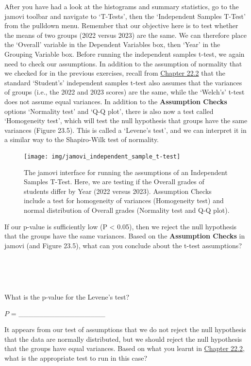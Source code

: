 \documentclass[
]{scrbook}
\begin{document}
After you have had a look at the histograms and summary statistics, go to the jamovi toolbar and navigate to `T-Tests', then the `Independent Samples T-Test' from the pulldown menu.
Remember that our objective here is to test whether the means of two groups (2022 versus 2023) are the same.
We can therefore place the `Overall' variable in the Dependent Variables box, then `Year' in the Grouping Variable box.
Before running the independent samples t-test, we again need to check our assumptions.
In addition to the assumption of normality that we checked for in the previous exercises, recall from \protect\hyperlink{independent-samples-t-test}{Chapter 22.2} that the standard `Student's' independent samples t-test also assumes that the variances of groups (i.e., the 2022 and 2023 scores) are the same, while the `Welch's' t-test does not assume equal variances.
In addition to the \textbf{Assumption Checks} options `Normality test' and `Q-Q plot', there is also now a test called `Homogeneity test', which will test the null hypothesis that groups have the same variances (Figure 23.5).
This is called a `Levene's test', and we can interpret it in a similar way to the Shapiro-Wilk test of normality.

\begin{figure}
\texttt{[image: img/jamovi\_independent\_sample\_t-test]} \caption{The jamovi interface for running the assumptions of an Independent Samples T-Test. Here, we are testing if the Overall grades of students differ by Year (2022 versus 2023). Assumption Checks include a test for homogeneity of variances (Homogeneity test) and normal distribution of Overall grades (Normality test and Q-Q plot).}\label{fig:unnamed-chunk-105}
\end{figure}

If our p-value is sufficiently low (P \textless{} 0.05), then we reject the null hypothesis that the groups have the same variances.
Based on the \textbf{Assumption Checks} in jamovi (and Figure 23.5), what can you conclude about the t-test assumptions?

\begin{verbatim}




\end{verbatim}

What is the p-value for the Levene's test?

\(P\) = \_\_\_\_\_\_\_\_\_\_\_\_\_\_\_\_\_

It appears from our test of assumptions that we do not reject the null hypothesis that the data are normally distributed, but we should reject the null hypothesis that the groups have equal variances.
Based on what you learnt in \protect\hyperlink{independent-samples-t-test}{Chapter 22.2}, what is the appropriate test to run in this case?
\end{document}
